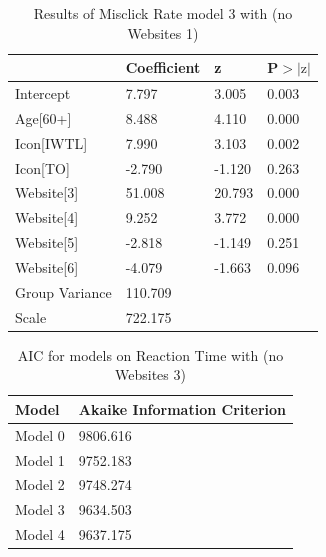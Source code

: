 \documentclass[12pt,twoside]{reedthesis}
\begin{document}
\begin{table}[h!]
        \centering
        \begin{tabular}{| p{5cm} | p{2.5cm} | p{2.5cm} | p{2.5cm} |}
            \hline
            & Coefficient & z & P$>|\text{z}|$\\
            \hline
            Intercept &  7.797 & 3.005  & 0.003\\
            \hline
            Age[60+] & 8.488 & 4.110 & 0.000\\
            \hline
            Icon[IWTL] & 7.990 & 3.103 & 0.002\\
            \hline
            Icon[TO] & -2.790 & -1.120 & 0.263\\
            \hline
            Website[3] & 51.008 & 20.793 & 0.000\\
            \hline
            Website[4] & 9.252 & 3.772 & 0.000\\
            \hline
            Website[5] & -2.818 & -1.149 & 0.251\\
            \hline
            Website[6] & -4.079 & -1.663 & 0.096\\
            \hline
            Group Variance & 110.709 &&\\
            \hline
            Scale & 722.175 &&\\
            \hline
        \end{tabular}
        \caption{Results of Misclick Rate model 3 with (no Websites 1)}
    \end{table}

\begin{table}[h!]
        \centering
        \begin{tabular}{| p{3.5cm} | p{7.5cm} |}
            \hline
            Model & Akaike Information Criterion\\
            \hline
            Model 0 & 9806.616\\
            \hline
            Model 1 & 9752.183\\
            \hline
            Model 2 & 9748.274\\
            \hline
            Model 3 & 9634.503\\
            \hline
            Model 4 & 9637.175\\
            \hline
        \end{tabular}
        \caption{AIC for models on Reaction Time with (no Websites 3)}
    \end{table}
\end{document}
